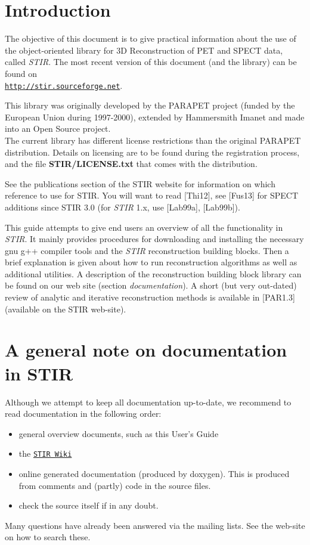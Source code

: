 \documentclass{article}
\def\url#1#2{\mbox{\href{#1}{\tt #2}}}
\begin{document}
\newpage

\tableofcontents


\section{
Introduction}

The objective of this document is to give practical information 
about the use of the object-oriented library for 3D Reconstruction 
of PET and SPECT data, called \textit{STIR}. The most recent version of this 
document (and the library) can be found on \\
\url{http://stir.sourceforge.net}{http://stir.sourceforge.net}.


This library was originally developed by the PARAPET 
project (funded by the European Union during 1997-2000), extended by Hammersmith 
Imanet and made into an Open Source project. \\
The current library has different license restrictions than the 
original PARAPET distribution. Details on licensing are to be 
found during the registration process, and the file \textbf{STIR/LICENSE.txt} 
that comes with the distribution. 

See the publications section of the STIR website for information on which reference
to use for STIR. You will want to read {[}Thi12], see {[}Fus13] for SPECT additions
since STIR 3.0 (for \textit{STIR} 1.x, use [Lab99a], [Lab99b]).



This guide attempts to give end users an overview of all the functionality
in \textit{STIR}. It mainly provides 
procedures for downloading and installing the necessary gnu g++ 
compiler tools and the \textit{STIR} reconstruction building blocks. 
Then a brief explanation is given about how to run reconstruction 
algorithms as well as additional utilities. A description of 
the reconstruction building block library can be found on our 
web site (section \textit{documentation}). A short (but very out-dated) review of analytic 
and iterative reconstruction methods is available in [PAR1.3] 
(available on the STIR web-site).

\section{
A general note on documentation in STIR}

Although we attempt to keep all documentation up-to-date, we 
recommend to read documentation in the following order:
\begin{itemize}
\item general overview documents, such as this User's Guide
\item the \url{http://sourceforge.net/apps/mediawiki/stir}{STIR Wiki}
\item 
online generated documentation (produced by doxygen). This is 
produced from comments and (partly) code in the source files.
\item check the source itself if in any doubt.
\end{itemize}
Many questions have already been answered via the mailing lists. See the
web-site on how to search these.
\end{document}
